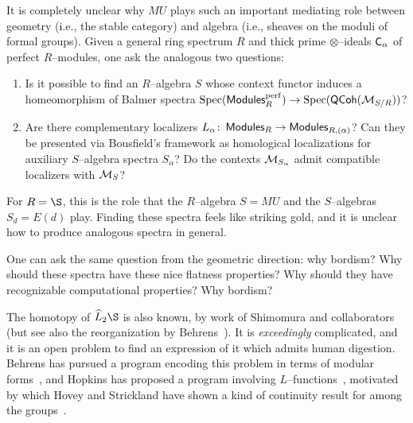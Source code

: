 \begin{remark}
It is completely unclear why $MU$ plays such an important mediating role between geometry (i.e., the stable category) and algebra (i.e., sheaves on the moduli of formal groups).  Given a general ring spectrum $R$ and thick prime $\otimes$--ideals $\mathsf{C}_\alpha$ of perfect $R$--modules, one ask the analogous two questions:
\begin{enumerate}
\item Is it possible to find an $R$--algebra $S$ whose context functor induces a homeomorphism of Balmer spectra $\operatorname{Spec}(\mathsf{Modules}_R^{\mathrm{perf}}) \to \operatorname{Spec}(\mathsf{QCoh}(\mathcal{M}_{S/R}))$?
\item Are there complementary localizers $L_\alpha\colon\thinspace \mathsf{Modules}_R \to \mathsf{Modules}_{R,(\alpha)}$?  Can they be presented via Bousfield's framework as homological localizations for auxiliary $S$--algebra spectra $S_\alpha$?  Do the contexts $\mathcal{M}_{S_\alpha}$ admit compatible localizers with $\mathcal{M}_{S}$?
\end{enumerate}
For $R = \S$, this is the role that the $R$--algebra $S = MU$ and the $S$--algebras $S_d = E(d)$ play.  Finding these spectra feels like striking gold, and it is unclear how to produce analogous spectra in general.
\end{remark}
\noindent One can ask the same question from the geometric direction: why bordism?  Why should these spectra have these nice flatness properties?  Why should they have recognizable computational properties?  Why bordism?




\begin{remark}
The homotopy of $\widehat L_2 \S$ is also known, by work of Shimomura and collaborators~\cite{Shimomura,ShimomuraYabeM20,ShimomuraYabeL2S} (but see also the reorganization by Behrens~\cite{BehrensRevisited}).  It is \emph{exceedingly} complicated, and it is an open problem to find an expression of it which admits human digestion.  Behrens has pursued a program encoding this problem in terms of modular forms~\cite{BehrensCongruences,BehrensModularDescription,BehrensBuildings}, and Hopkins has proposed a program involving $L$--functions~\cite{StricklandpAdicInterpolation}, motivated by which Hovey and Strickland have shown a kind of continuity result for among the groups~\cite[Section 14]{HoveyStrickland}.
\end{remark}





